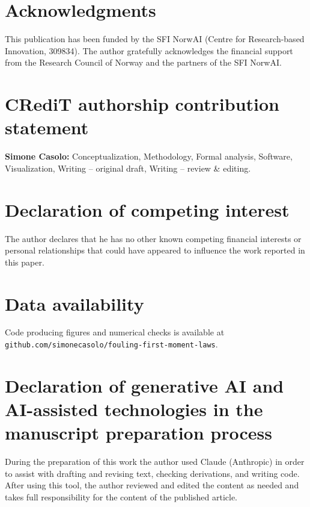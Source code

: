 \documentclass[preprint,12pt]{elsarticle}
\begin{document}
\section*{Acknowledgments}
This publication has been funded by the SFI NorwAI
(Centre for Research-based Innovation, 309834). The author gratefully
acknowledges the financial
support from the Research Council of Norway and the partners of the SFI NorwAI.

\section*{CRediT authorship contribution statement}
\textbf{Simone Casolo:} Conceptualization, Methodology, Formal analysis,
Software, Visualization, Writing -- original draft, Writing -- review \& editing.

\section*{Declaration of competing interest}
The author declares that he has no other
known competing financial interests or personal relationships that could have
appeared to influence the work reported in this paper.

\section*{Data availability}
Code producing figures and numerical checks is available at 
\texttt{github.com/\allowbreak simonecasolo/\allowbreak fouling-first-moment-laws}.



\section*{Declaration of generative AI and AI-assisted technologies in the manuscript preparation process}
During the preparation of this work the
author used Claude (Anthropic) in order to assist with 
drafting and revising text, checking derivations, and writing
code. After using this tool, the author reviewed and edited
the content as needed and takes full responsibility for the content of the
published article.



\end{document}
